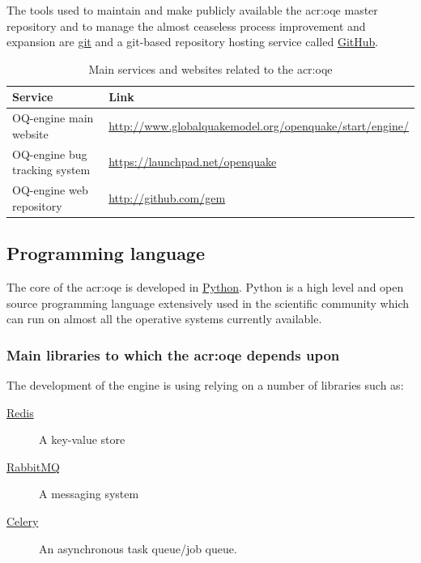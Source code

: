 The tools used to maintain and make publicly available the \gls{acr:oqe} 
master repository and to manage the almost ceaseless process improvement 
and expansion are \href{http://git-scm.com/}{git} and a git-based repository 
hosting service called \href{http://github.com/}{GitHub}.
%
\begin{table}[!t]
\centering
\begin{tabular}{p{4cm}p{9cm}}
\hline
\rowcolor{anti-flashwhite}
\bf{Service} & \bf{Link}  \\
\hline 
OQ-engine main website & 
    \href{http://www.globalquakemodel.org/openquake/start/engine/}
        {http://www.globalquakemodel.org/openquake/start/engine/} \\
OQ-engine bug tracking system & 
    \href{https://launchpad.net/openquake}{https://launchpad.net/openquake} \\
OQ-engine web repository & 
    \href{http://github.com/gem}{http://github.com/gem} \\
\hline
\end{tabular}
\caption{Main services and websites related to the \gls{acr:oqe}}
\end{table}
%
\subsection{Programming language}
The core of the \gls{acr:oqe} is developed in 
\href{https://www.python.org/}{Python}. Python is a high level and open 
source programming language extensively used in the scientific community 
which can run on almost all the operative systems currently available.
%
\subsubsection{Main libraries to which the \gls{acr:oqe} depends upon}
The development of the engine is using relying on a number of libraries such 
as:
\begin{description}
    \item [\href{http://redis.io/}{Redis}] A key-value store
    \item [\href{https://www.rabbitmq.com/}{RabbitMQ}] A messaging system
    \item [\href{http://www.celeryproject.org/}{Celery}] An asynchronous 
        task queue/job queue.
\end{description}
%
